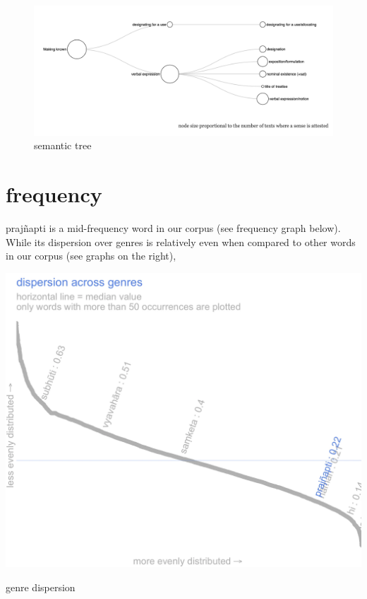 \documentclass[
  letterpaper,
  DIV=11,
  numbers=noendperiod,
  oneside]{scrreprt}
\begin{document}
\begin{figure}

{\centering \includegraphics{./www/semanticTree_prajJapti.png}

}

\caption{\label{fig-semantictree}semantic tree}

\end{figure}

\hypertarget{sec-freq}{%
\section{frequency}\label{sec-freq}}

prajñapti is a mid-frequency word in our corpus (see frequency graph
below). While its dispersion over genres is relatively even when
compared to other words in our corpus (see graphs on the right),

\begin{marginfigure}

{\centering \includegraphics{./www/genreDP_prajJapti.webp}

}

\caption{\label{fig-genredp}genre dispersion}

\end{marginfigure}
\end{document}
